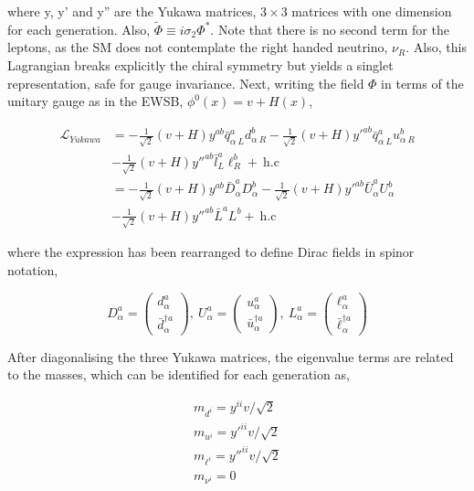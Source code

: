 where y, y' and y'' are the Yukawa matrices, $3\times3$ matrices with one dimension for each generation. Also, $\tilde{\Phi}\equiv i\sigma_2\Phi^*$. Note that there is no second term for the leptons, as the SM does not contemplate the right handed neutrino, $\nu_R$. Also, this Lagrangian breaks explicitly the chiral symmetry but yields a singlet representation, safe for gauge invariance. Next, writing the field $\Phi$ in terms of the unitary gauge as in the EWSB, $\phi^0(x)=v+H(x)$,

\begin{equation}
\begin{split}
    \mathcal{L}_{Yukawa} &= -\frac{1}{\sqrt{2}}(v+H)y^{ab}\bar{q}^a_{\alpha\ L} d^b_{\alpha\ R} - \frac{1}{\sqrt{2}}(v+H)y'^{ab}\bar{q}^a_{\alpha\ L}u^b_{\alpha\ R}\\
    &-\frac{1}{\sqrt{2}}(v+H)y''^{ab}\bar{l}^a_{L}\ell^b_{R}+\ \text{h.c}\\
    &=-\frac{1}{\sqrt{2}}(v+H)y^{ab} \bar{D}^a_\alpha D^b_\alpha - \frac{1}{\sqrt{2}}(v+H)y'^{ab}\bar{U}^a_\alpha U^b_\alpha\\
    &-\frac{1}{\sqrt{2}}(v+H)y''^{ab}\bar{L}^a L^b+\ \text{h.c}
\end{split}
\end{equation}

where the expression has been rearranged to define Dirac fields in spinor notation,

\begin{equation}
\label{Theory_eq:Diracmassspace}
    D_\alpha^a = \begin{pmatrix} d_\alpha^a \\ \bar{d}^{\dag a}_\alpha \end{pmatrix},\ 
    U_\alpha^a = \begin{pmatrix} u_\alpha^a \\ \bar{u}^{\dag a}_\alpha \end{pmatrix},\ 
    L_\alpha^a = \begin{pmatrix} \ell_\alpha^a \\ \bar{\ell}^{\dag a}_\alpha \end{pmatrix}
\end{equation}

After diagonalising the three Yukawa matrices, the eigenvalue terms are related to the masses, which can be identified for each generation as,

\begin{equation}
\begin{split}
m_{d^i} = y^{ii}v/\sqrt{2} \\ 
m_{u^i} = y'^{ii}v/\sqrt{2} \\
m_{\ell^i} = y''^{ii}v/\sqrt{2} \\
m_{\nu^i} = 0
\end{split}
\label{Theory_eq:yukawacouplings}
\end{equation}

